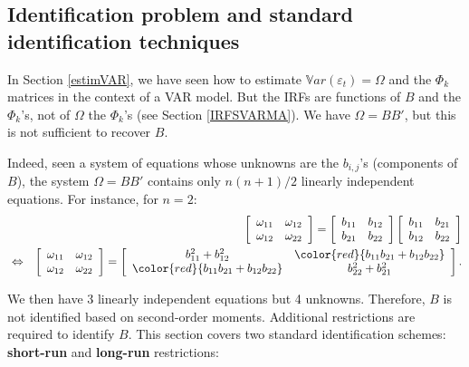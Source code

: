 \documentclass[
  12pt,
]{book}
\theoremstyle{definition}
\theoremstyle{definition}
\theoremstyle{definition}
\theoremstyle{definition}
\theoremstyle{remark}
\begin{document}
\hypertarget{identification-problem-and-standard-identification-techniques}{%
\subsection{Identification problem and standard identification techniques}\label{identification-problem-and-standard-identification-techniques}}

In Section \ref{estimVAR}, we have seen how to estimate \(\mathbb{V}ar(\varepsilon_t) =\Omega\) and the \(\Phi_k\) matrices in the context of a VAR model. But the IRFs are functions of \(B\) and the \(\Phi_k\)'s, not of \(\Omega\) the \(\Phi_k\)'s (see Section \ref{IRFSVARMA}). We have \(\Omega = BB'\), but this is not sufficient to recover \(B\).

Indeed, seen a system of equations whose unknowns are the \(b_{i,j}\)'s (components of \(B\)), the system \(\Omega = BB'\) contains only \(n(n+1)/2\) linearly independent equations. For instance, for \(n=2\):
\begin{eqnarray*}
&&\left[
\begin{array}{cc}
\omega_{11} & \omega_{12} \\
\omega_{12} & \omega_{22}
\end{array}
\right] = \left[
\begin{array}{cc}
b_{11} & b_{12} \\
b_{21} & b_{22}
\end{array}
\right]\left[
\begin{array}{cc}
b_{11} & b_{21} \\
b_{12} & b_{22}
\end{array}
\right]\\
&\Leftrightarrow&\left[
\begin{array}{cc}
\omega_{11} & \omega_{12} \\
\omega_{12} & \omega_{22}
\end{array}
\right] = \left[
\begin{array}{cc}
b_{11}^2+b_{12}^2 & \color{red}{b_{11}b_{21}+b_{12}b_{22}} \\
\color{red}{b_{11}b_{21}+b_{12}b_{22}} & b_{22}^2 + b_{21}^2
\end{array}
\right].
\end{eqnarray*}

We then have 3 linearly independent equations but 4 unknowns. Therefore, \(B\) is not identified based on second-order moments. Additional restrictions are required to identify \(B\). This section covers two standard identification schemes: \textbf{short-run} and \textbf{long-run} restrictions:
\end{document}
